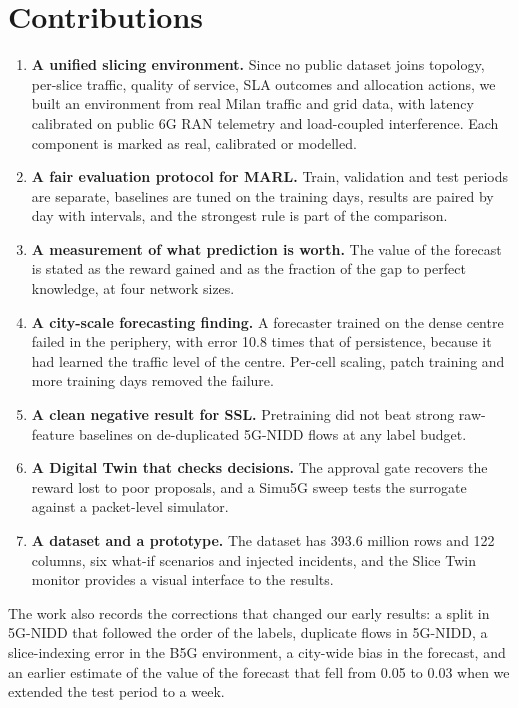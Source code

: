 \section{Contributions}
\label{Contributions}
\begin{enumerate}
    \item \textbf{A unified slicing environment.} Since no public dataset joins topology, per-slice traffic, quality of service, SLA outcomes and allocation actions, we built an environment from real Milan traffic and grid data, with latency calibrated on public 6G RAN telemetry and load-coupled interference. Each component is marked as real, calibrated or modelled.
    \item \textbf{A fair evaluation protocol for MARL.} Train, validation and test periods are separate, baselines are tuned on the training days, results are paired by day with intervals, and the strongest rule is part of the comparison.
    \item \textbf{A measurement of what prediction is worth.} The value of the forecast is stated as the reward gained and as the fraction of the gap to perfect knowledge, at four network sizes.
    \item \textbf{A city-scale forecasting finding.} A forecaster trained on the dense centre failed in the periphery, with error 10.8 times that of persistence, because it had learned the traffic level of the centre. Per-cell scaling, patch training and more training days removed the failure.
    \item \textbf{A clean negative result for SSL.} Pretraining did not beat strong raw-feature baselines on de-duplicated 5G-NIDD flows at any label budget.
    \item \textbf{A Digital Twin that checks decisions.} The approval gate recovers the reward lost to poor proposals, and a Simu5G sweep tests the surrogate against a packet-level simulator.
    \item \textbf{A dataset and a prototype.} The dataset has 393.6 million rows and 122 columns, six what-if scenarios and injected incidents, and the Slice Twin monitor provides a visual interface to the results.
\end{enumerate}
The work also records the corrections that changed our early results: a split in 5G-NIDD that followed the order of the labels, duplicate flows in 5G-NIDD, a slice-indexing error in the B5G environment, a city-wide bias in the forecast, and an earlier estimate of the value of the forecast that fell from 0.05 to 0.03 when we extended the test period to a week.

